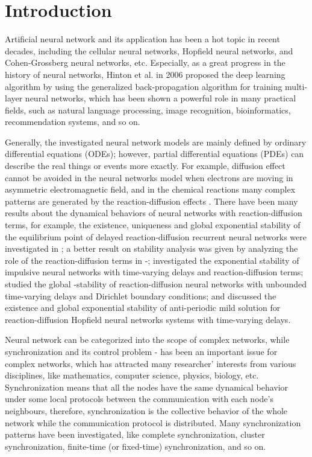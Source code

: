 \documentclass[review]{elsarticle}
\begin{document}
\section{Introduction}
Artificial neural network and its application has been a hot topic in recent decades, including the cellular neural networks, Hopfield neural networks, and Cohen-Grossberg neural networks, etc. Especially, as a great progress in the history of neural networks, Hinton et al. in 2006 proposed the deep learning algorithm \cite{H2006} by using the generalized back-propagation algorithm for training multi-layer neural networks, which has been shown a powerful role in many practical fields, such as natural language processing, image recognition, bioinformatics, recommendation systems, and so on.

Generally, the investigated neural network models are mainly defined by ordinary differential equations (ODEs); however, partial differential equations (PDEs) can describe the real things or events more exactly. For example, diffusion effect cannot be avoided in the neural networks model when electrons are moving in asymmetric electromagnetic field, and in the chemical reactions many complex patterns are generated by the reaction-diffusion effects \cite{Turing,AJB2011}. There have been many results about the dynamical behaviors of neural networks with reaction-diffusion terms, for example, the existence, uniqueness and global exponential stability of the equilibrium point of delayed reaction-diffusion recurrent neural networks were investigated in \cite{LC03}; a better result on stability analysis was given by analyzing the role of the reaction-diffusion terms in \cite{L07}-\cite{WL08}; \cite{Q2007} investigated the exponential stability of impulsive neural networks with time-varying delays and reaction-diffusion terms; \cite{CZ2011} studied the global -stability of reaction-diffusion neural networks with unbounded time-varying delays and Dirichlet boundary conditions; and \cite{CFZ2013} discussed the existence and global exponential stability of anti-periodic mild solution for reaction-diffusion Hopfield neural networks systems with time-varying delays.

Neural network can be categorized into the scope of complex networks, while synchronization and its control problem \cite{WL95}-\cite{CLL07} has been an important issue for complex networks, which has attracted many researcher' interests from various disciplines, like mathematics, computer science, physics, biology, etc. Synchronization means that all the nodes have the same dynamical behavior under some local protocols between the communication with each node's neighbours, therefore, synchronization is the collective behavior of the whole network while the communication protocol is distributed. Many synchronization patterns have been investigated, like complete synchronization, cluster synchronization, finite-time (or fixed-time) synchronization, and so on.
\end{document}
